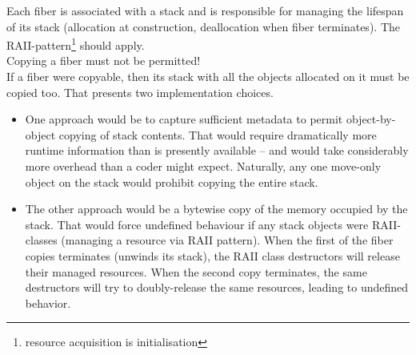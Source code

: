 \label{stackmgmt}

Each fiber is associated with a stack and is responsible for managing the lifespan
of its stack (allocation at construction, deallocation when fiber terminates). The
RAII-pattern\footnote{resource acquisition is initialisation} should apply.\\

Copying a fiber must not be permitted!\\
If a fiber were copyable, then its stack with all the objects allocated on it
must be copied too. That presents two implementation choices.
\begin{itemize}
    \item One approach would be to capture sufficient metadata to permit
          object-by-object copying of stack contents. That would require
          dramatically more runtime information than is presently available --
          and would take considerably more overhead than a coder might expect.
          Naturally, any one move-only object on the stack would prohibit
          copying the entire stack.
    \item The other approach would be a bytewise copy of the memory occupied
          by the stack. That would force undefined behaviour if any stack
          objects were RAII-classes (managing a resource via RAII pattern). When the first
          of the fiber copies terminates (unwinds its stack), the RAII class destructors
          will release their managed resources. When the second copy terminates, the same
          destructors will try to doubly-release the same resources, leading to undefined
          behavior.
\end{itemize}

